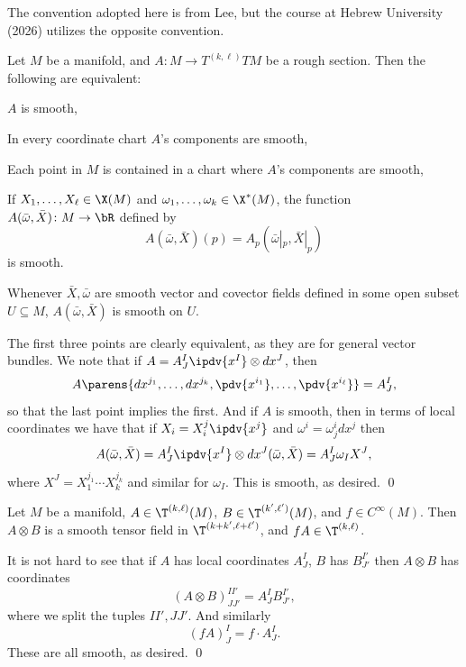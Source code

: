     The convention adopted here is from Lee, but the course at Hebrew University (2026) utilizes the opposite convention.

\enote

\bprop

    Let $M$ be a manifold, and $A\colon M\to T^{(k,\ell)}TM$ be a rough section.
    Then the following are equivalent:
    \benum
        \item $A$ is smooth,
        \item In every coordinate chart $A$'s components are smooth,
        \item Each point in $M$ is contained in a chart where $A$'s components are smooth,
        \item If $X_1,\dots,X_\ell\in\X(M)$ and $\omega_1,\dots,\omega_k\in\X^*(M)$, the function $A(\bar\omega,\bar X)\colon M\to\bR$ defined by
        $$ A(\bar\omega,\bar X)(p) = A_p(\bar\omega|_p,\bar X|_p) $$
        is smooth.
        \item Whenever $\bar X,\bar\omega$ are smooth vector and covector fields defined in some open subset $U\subseteq M$, $A(\bar\omega,\bar X)$ is smooth on $U$.
    \eenum

\eprop

\bproof
    
    The first three points are clearly equivalent, as they are for general vector bundles.
    We note that if $A=A^I_J\ipdv{x^I}\otimes dx^J$, then
    $$ A\parens{dx^{j_1},\dots,dx^{j_k},\pdv{x^{i_1}},\dots,\pdv{x^{i_\ell}}} = A^I_J , $$
    so that the last point implies the first.
    And if $A$ is smooth, then in terms of local coordinates we have that if $X_i=X_i^j\ipdv{x^j}$ and $\omega^i=\omega^i_jdx^j$ then
    $$ A(\bar\omega,\bar X) = A^I_J\ipdv{x^I}\otimes dx^J(\bar\omega,\bar X) = A^I_J\omega_IX^J, $$
    where $X^J=X_1^{j_1}\cdots X_k^{j_k}$ and similar for $\omega_I$.
    This is smooth, as desired.
    \qed

\eproof

\bprop

    Let $M$ be a manifold, $A\in\T^{(k,\ell)}(M)$, $B\in\T^{(k',\ell')}(M)$, and $f\in C^\infty(M)$.
    Then $A\otimes B$ is a smooth tensor field in $\T^{(k+k',\ell+\ell')}$, and $fA\in\T^{(k,\ell)}$.

\eprop

\bproof

    It is not hard to see that if $A$ has local coordinates $A^I_J$, $B$ has $B^{I'}_{J'}$ then $A\otimes B$ has coordinates
    $$ (A\otimes B)^{II'}_{JJ'} = A^I_JB^{I'}_{J'} , $$
    where we split the tuples $II',JJ'$.
    And similarly
    $$ (fA)^I_J = f\cdot A^I_J. $$
    These are all smooth, as desired.
    \qed

